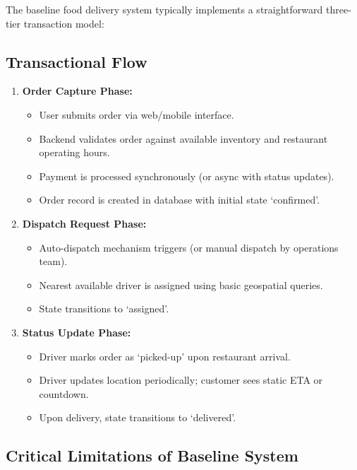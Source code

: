 \documentclass[12pt,a4paper]{report}
\begin{document}
The baseline food delivery system typically implements a straightforward three-tier transaction model:

\subsection{Transactional Flow}
\begin{enumerate}
    \item \textbf{Order Capture Phase:} 
    \begin{itemize}
        \item User submits order via web/mobile interface.
        \item Backend validates order against available inventory and restaurant operating hours.
        \item Payment is processed synchronously (or async with status updates).
        \item Order record is created in database with initial state `confirmed'.
    \end{itemize}
    
    \item \textbf{Dispatch Request Phase:}
    \begin{itemize}
        \item Auto-dispatch mechanism triggers (or manual dispatch by operations team).
        \item Nearest available driver is assigned using basic geospatial queries.
        \item State transitions to `assigned'.
    \end{itemize}
    
    \item \textbf{Status Update Phase:}
    \begin{itemize}
        \item Driver marks order as `picked-up' upon restaurant arrival.
        \item Driver updates location periodically; customer sees static ETA or countdown.
        \item Upon delivery, state transitions to `delivered'.
    \end{itemize}
\end{enumerate}

\subsection{Critical Limitations of Baseline System}
\end{document}
